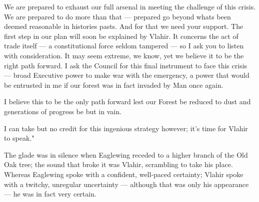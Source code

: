 
We are prepared to exhaust our full arsenal in meeting the challenge of this crisis. We are prepared to do more than that — prepared go beyond whats been deemed reasonable in histories pasts. And for that we need your support.
The first step in our plan will soon be explained by Vlahir. It concerns the act of trade itself — a constitutional force seldom tampered — so I ask you to listen with consideration. It may seem extreme, we know, yet we believe it to be the right path forward. I ask the Council for this final instrument to face this crisis — broad Executive power to make war with the emergency, a power that would be entrusted in me if our forest was in fact invaded by Man once again. 


I believe this to be the only path forward lest our Forest be reduced to dust and generations of progress be but in vain.

I can take but no credit for this ingenious strategy however; it's time for Vlahir to speak."

The glade was in silence when Eaglewing receded to a higher branch of the Old Oak tree; the sound that broke it was Vlahir, scrambling to take his place. Whereas Eaglewing spoke with a confident, well-paced certainty; Vlahir spoke with a twitchy, unregular uncertainty — although that was only his appearance — he was in fact very certain.





